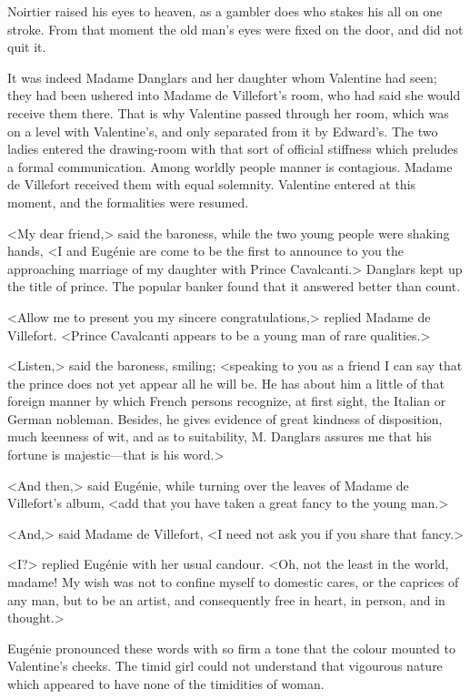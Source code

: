  Noirtier raised his eyes to heaven, as a gambler does who stakes his all on one stroke. From that moment the old man's eyes were fixed on the door, and did not quit it. 

 It was indeed Madame Danglars and her daughter whom Valentine had seen; they had been ushered into Madame de Villefort's room, who had said she would receive them there. That is why Valentine passed through her room, which was on a level with Valentine's, and only separated from it by Edward's. The two ladies entered the drawing-room with that sort of official stiffness which preludes a formal communication. Among worldly people manner is contagious. Madame de Villefort received them with equal solemnity. Valentine entered at this moment, and the formalities were resumed. 

 <My dear friend,> said the baroness, while the two young people were shaking hands, <I and Eugénie are come to be the first to announce to you the approaching marriage of my daughter with Prince Cavalcanti.> Danglars kept up the title of prince. The popular banker found that it answered better than count. 

 <Allow me to present you my sincere congratulations,> replied Madame de Villefort. <Prince Cavalcanti appears to be a young man of rare qualities.>

<Listen,> said the baroness, smiling; <speaking to you as a friend I can say that the prince does not yet appear all he will be. He has about him a little of that foreign manner by which French persons recognize, at first sight, the Italian or German nobleman. Besides, he gives evidence of great kindness of disposition, much keenness of wit, and as to suitability, M. Danglars assures me that his fortune is majestic—that is his word.> 

 <And then,> said Eugénie, while turning over the leaves of Madame de Villefort's album, <add that you have taken a great fancy to the young man.> 

 <And,> said Madame de Villefort, <I need not ask you if you share that fancy.> 

 <I?> replied Eugénie with her usual candour. <Oh, not the least in the world, madame! My wish was not to confine myself to domestic cares, or the caprices of any man, but to be an artist, and consequently free in heart, in person, and in thought.> 

 Eugénie pronounced these words with so firm a tone that the colour mounted to Valentine's cheeks. The timid girl could not understand that vigourous nature which appeared to have none of the timidities of woman. 

